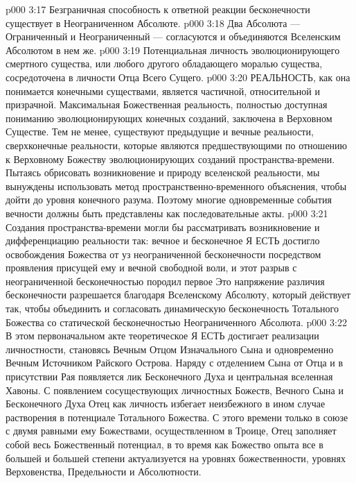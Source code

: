 \vs p000 3:17 \bibnobreakspace Безграничная способность к ответной реакции бесконечности существует в Неограниченном Абсолюте.
\vs p000 3:18 \bibnobreakspace Два Абсолюта --- Ограниченный и Неограниченный --- согласуются и объединяются Вселенским Абсолютом в нем же.
\vs p000 3:19 \bibnobreakspace Потенциальная личность эволюционирующего смертного существа, или любого другого обладающего моралью существа, сосредоточена в личности Отца Всего Сущего.
\vs p000 3:20 \pc РЕАЛЬНОСТЬ, как она понимается конечными существами, является частичной, относительной и призрачной. Максимальная Божественная реальность, полностью доступная пониманию эволюционирующих конечных созданий, заключена в Верховном Существе. Тем не менее, существуют предыдущие и вечные реальности, сверхконечные реальности, которые являются предшествующими по отношению к Верховному Божеству эволюционирующих созданий пространства\hyp{}времени. Пытаясь обрисовать возникновение и природу вселенской реальности, мы вынуждены использовать метод пространственно\hyp{}временного объяснения, чтобы дойти до уровня конечного разума. Поэтому многие одновременные события вечности должны быть представлены как последовательные акты.
\vs p000 3:21 Создания пространства\hyp{}времени могли бы рассматривать возникновение и дифференциацию реальности так: вечное и бесконечное Я ЕСТЬ достигло освобождения Божества от уз неограниченной бесконечности посредством проявления присущей ему и вечной свободной воли, и этот разрыв с неограниченной бесконечностью породил первое  Это напряжение различия бесконечности разрешается благодаря Вселенскому Абсолюту, который действует так, чтобы объединить и согласовать динамическую бесконечность Тотального Божества со статической бесконечностью Неограниченного Абсолюта.
\vs p000 3:22 В этом первоначальном акте теоретическое Я ЕСТЬ достигает реализации личностности, становясь Вечным Отцом Изначального Сына и одновременно Вечным Источником Райского Острова. Наряду с отделением Сына от Отца и в присутствии Рая появляется лик Бесконечного Духа и центральная вселенная Хавоны. С появлением сосуществующих личностных Божеств, Вечного Сына и Бесконечного Духа Отец как личность избегает неизбежного в ином случае растворения в потенциале Тотального Божества. С этого времени только в союзе с двумя равными ему Божествами, осуществленном в Троице, Отец заполняет собой весь Божественный потенциал, в то время как Божество опыта все в большей и большей степени актуализуется на уровнях божественности, уровнях Верховенства, Предельности и Абсолютности.
